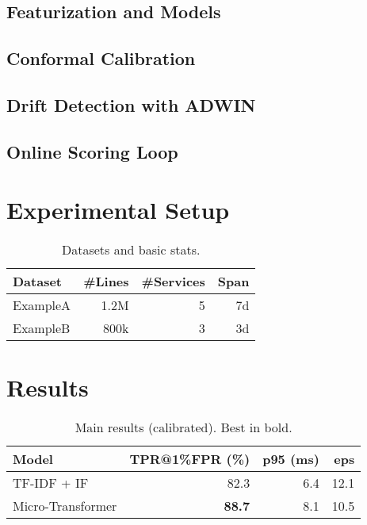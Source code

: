 \documentclass[10pt,twocolumn]{article}
\begin{document}
\subsection{Featurization and Models}

\subsection{Conformal Calibration}

\subsection{Drift Detection with ADWIN}

\subsection{Online Scoring Loop}

\section{Experimental Setup}
\begin{table}[t]
  \centering
  \caption{Datasets and basic stats.}
  \label{tab:datasets}
  \begin{tabular}{lrrr}
    \toprule
    Dataset & \#Lines & \#Services & Span \\
    \midrule
    ExampleA & 1.2M & 5 & 7d \\
    ExampleB & 800k & 3 & 3d \\
    \bottomrule
  \end{tabular}
\end{table}

\section{Results}
\begin{table}[t]
  \centering
  \caption{Main results (calibrated). Best in bold.}
  \label{tab:main}
  \begin{tabular}{lrrr}
    \toprule
    Model & TPR@1\%FPR (\%) & p95 (ms) & eps \\
    \midrule
    TF-IDF + IF &  82.3 &  6.4 & 12.1 \\
    Micro-Transformer & \textbf{88.7} &  8.1 & 10.5 \\
    \bottomrule
  \end{tabular}
\end{table}
\end{document}
